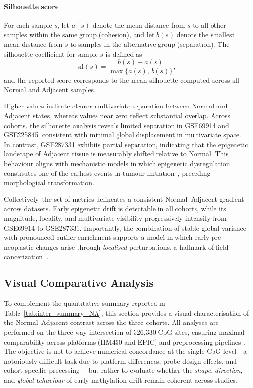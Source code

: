 \paragraph{Silhouette score}  

For each sample $s$, let $a(s)$ denote the mean distance from $s$ to all other samples within the same group (cohesion), and let $b(s)$ denote the smallest mean distance from $s$ to samples in the alternative group (separation).  
The silhouette coefficient for sample $s$ is defined as
\begin{equation}
\mathrm{sil}(s) =
\frac{b(s) - a(s)}{\max\{a(s),\, b(s)\}},
\label{eq:silhouette}
\end{equation}
and the reported score corresponds to the mean silhouette computed across all Normal and Adjacent samples.

Higher values indicate clearer multivariate separation between Normal and Adjacent states, whereas values near zero reflect substantial overlap. Across cohorts, the silhouette analysis reveals limited separation in GSE69914 and GSE225845, consistent with minimal global displacement in multivariate space. In contrast, GSE287331 exhibits partial separation, indicating that the epigenetic landscape of Adjacent tissue is measurably shifted relative to Normal. This behaviour aligns with mechanistic models in which epigenetic dysregulation constitutes one of the earliest events in tumour initiation~\cite{Zhang2024_TumorInitiationEpigenetic}, preceding morphological transformation.

Collectively, the set of metrics delineates a consistent Normal--Adjacent gradient across datasets. Early epigenetic drift is detectable in all cohorts, while its magnitude, focality, and multivariate visibility progressively intensify from GSE69914 to GSE287331. Importantly, the combination of stable global variance with pronounced outlier enrichment supports a model in which early pre-neoplastic changes arise through \emph{localised} perturbations, a hallmark of field cancerization~\cite{Yates2024_NormalMucosaField, teschendorff2016}.

\subsection{Visual Comparative Analysis}
\label{subsec:inter_visual}

To complement the quantitative summary reported in 
Table~\ref{tab:inter_summary_NA}, this section provides a visual 
characterisation of the Normal--Adjacent contrast across the three 
cohorts. All analyses are performed on the three-way intersection of 
326{,}330 CpG sites, ensuring maximal comparability across platforms 
(HM450 and EPIC) and preprocessing pipelines \cite{zhou2017}. The objective is not to achieve numerical concordance at the single-CpG 
level---a notoriously difficult task due to platform differences, 
probe-design effects, and cohort-specific processing 
\cite{pidsley2016, Fortin2014_funnorm}---but rather to evaluate 
whether the \emph{shape}, \emph{direction}, and \emph{global behaviour} 
of early methylation drift remain coherent across studies.


